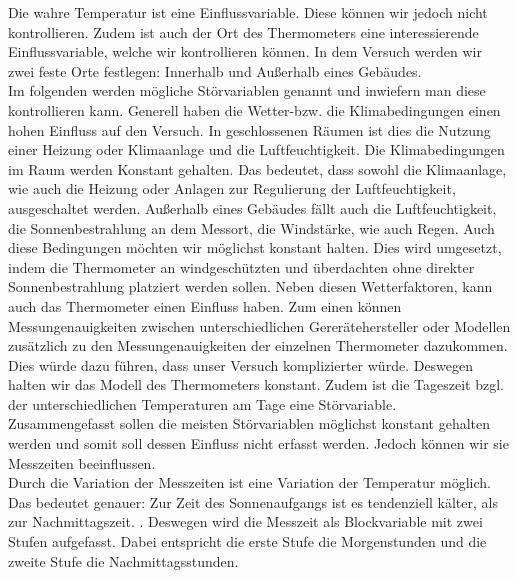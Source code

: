\documentclass[ ngerman, fontsize= 12pt, paper=a4, headings=big, titlepage=true]{article}
\begin{document}
Die wahre Temperatur ist eine Einflussvariable. Diese können wir jedoch nicht kontrollieren.  Zudem ist auch der Ort des Thermometers eine interessierende Einflussvariable, welche wir kontrollieren können. In dem Versuch werden wir zwei feste Orte festlegen: Innerhalb und Außerhalb eines Gebäudes. \\


Im folgenden werden mögliche Störvariablen genannt und inwiefern man diese kontrollieren kann. Generell haben die Wetter-bzw. die Klimabedingungen einen hohen Einfluss auf den Versuch.  In geschlossenen Räumen ist dies die Nutzung einer Heizung oder Klimaanlage und die Luftfeuchtigkeit. Die Klimabedingungen im Raum werden Konstant gehalten. Das bedeutet, dass sowohl die Klimaanlage, wie auch die Heizung oder Anlagen zur Regulierung der Luftfeuchtigkeit, ausgeschaltet werden. Außerhalb eines Gebäudes fällt auch die Luftfeuchtigkeit, die Sonnenbestrahlung an dem Messort, die Windstärke, wie auch Regen. Auch diese Bedingungen möchten wir möglichst konstant halten. Dies wird umgesetzt, indem die Thermometer an windgeschützten und überdachten ohne direkter Sonnenbestrahlung platziert werden sollen. Neben diesen Wetterfaktoren, kann auch das Thermometer einen Einfluss haben. Zum einen können Messungenauigkeiten zwischen unterschiedlichen Gererätehersteller oder Modellen zusätzlich zu den Messungenauigkeiten der einzelnen Thermometer dazukommen. Dies würde dazu führen, dass unser Versuch komplizierter würde. Deswegen halten wir das Modell des Thermometers konstant. Zudem ist die Tageszeit bzgl. der unterschiedlichen Temperaturen am Tage eine Störvariable. \\

Zusammengefasst sollen die meisten Störvariablen möglichst konstant gehalten werden und somit soll dessen Einfluss nicht erfasst werden. Jedoch können wir sie Messzeiten beeinflussen.  \\

Durch die Variation der Messzeiten ist eine Variation der Temperatur möglich. Das bedeutet genauer: Zur Zeit des Sonnenaufgangs ist es tendenziell kälter, als zur Nachmittagszeit. \cite{WK2}. Deswegen wird die Messzeit als Blockvariable mit zwei Stufen aufgefasst. Dabei  entspricht die erste Stufe die Morgenstunden und die zweite Stufe die Nachmittagsstunden. 
\end{document}
